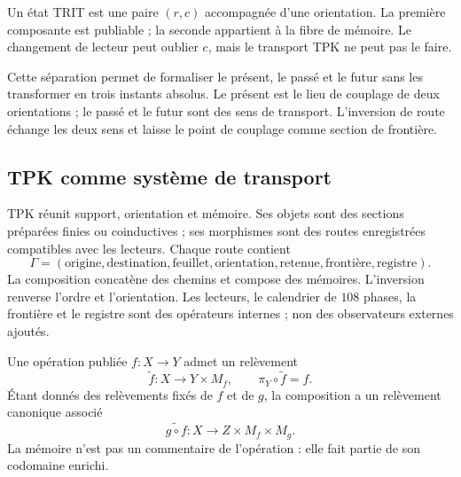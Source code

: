 \begin{definition}
Un état TRIT est une paire \((r,c)\) accompagnée d’une orientation. La première
composante est publiable ; la seconde appartient à la fibre de mémoire. Le
changement de lecteur peut oublier \(c\), mais le transport TPK ne peut pas le faire.
\end{definition}

Cette séparation permet de formaliser le présent, le passé et le futur sans les transformer
en trois instants absolus. Le présent est le lieu de couplage de deux
orientations ; le passé et le futur sont des sens de transport. L’inversion de
route échange les deux sens et laisse le point de couplage comme section
de frontière.

\subsection{TPK comme système de transport}

TPK réunit support, orientation et mémoire. Ses objets sont des sections préparées
finies ou coinductives ; ses morphismes sont des routes enregistrées compatibles avec les
lecteurs. Chaque route contient
\[
\Gamma=(\text{origine},\text{destination},\text{feuillet},\text{orientation},
\text{retenue},\text{frontière},\text{registre}).
\]
La composition concatène des chemins et compose des mémoires. L’inversion renverse
l’ordre et l’orientation. Les lecteurs, le calendrier de \(108\) phases, la frontière et le
registre sont des opérateurs internes ; non des observateurs externes ajoutés.

Une opération publiée \(f:X\to Y\) admet un relèvement
\[
 \widetilde f:X\longrightarrow Y\times M_f,
 \qquad \pi_Y\circ\widetilde f=f.
\]
Étant donnés des relèvements fixés de \(f\) et de \(g\), la composition a un
relèvement canonique associé
\[
 \widetilde{g\circ f}:X\longrightarrow Z\times M_f\times M_g.
\]
La mémoire n’est pas un commentaire de l’opération : elle fait partie de son codomaine
enrichi.

